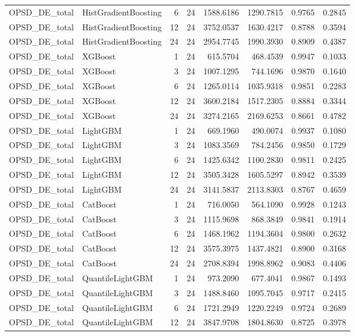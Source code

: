 \begin{tabular}{llrrrrrr}
OPSD_DE_total & HistGradientBoosting & 6 & 24 & 1588.6186 & 1290.7815 & 0.9765 & 0.2845 \\
OPSD_DE_total & HistGradientBoosting & 12 & 24 & 3752.0537 & 1630.4217 & 0.8788 & 0.3594 \\
OPSD_DE_total & HistGradientBoosting & 24 & 24 & 2954.7745 & 1990.3930 & 0.8909 & 0.4387 \\
OPSD_DE_total & XGBoost & 1 & 24 & 615.5704 & 468.4539 & 0.9947 & 0.1033 \\
OPSD_DE_total & XGBoost & 3 & 24 & 1007.1295 & 744.1696 & 0.9870 & 0.1640 \\
OPSD_DE_total & XGBoost & 6 & 24 & 1265.0114 & 1035.9318 & 0.9851 & 0.2283 \\
OPSD_DE_total & XGBoost & 12 & 24 & 3600.2184 & 1517.2305 & 0.8884 & 0.3344 \\
OPSD_DE_total & XGBoost & 24 & 24 & 3274.2165 & 2169.6253 & 0.8661 & 0.4782 \\
OPSD_DE_total & LightGBM & 1 & 24 & 669.1960 & 490.0074 & 0.9937 & 0.1080 \\
OPSD_DE_total & LightGBM & 3 & 24 & 1083.3569 & 784.2456 & 0.9850 & 0.1729 \\
OPSD_DE_total & LightGBM & 6 & 24 & 1425.6342 & 1100.2830 & 0.9811 & 0.2425 \\
OPSD_DE_total & LightGBM & 12 & 24 & 3505.3428 & 1605.5297 & 0.8942 & 0.3539 \\
OPSD_DE_total & LightGBM & 24 & 24 & 3141.5837 & 2113.8303 & 0.8767 & 0.4659 \\
OPSD_DE_total & CatBoost & 1 & 24 & 716.0050 & 564.1090 & 0.9928 & 0.1243 \\
OPSD_DE_total & CatBoost & 3 & 24 & 1115.9698 & 868.3849 & 0.9841 & 0.1914 \\
OPSD_DE_total & CatBoost & 6 & 24 & 1468.1962 & 1194.3604 & 0.9800 & 0.2632 \\
OPSD_DE_total & CatBoost & 12 & 24 & 3575.3975 & 1437.4821 & 0.8900 & 0.3168 \\
OPSD_DE_total & CatBoost & 24 & 24 & 2708.8394 & 1998.8962 & 0.9083 & 0.4406 \\
OPSD_DE_total & QuantileLightGBM & 1 & 24 & 973.2090 & 677.4041 & 0.9867 & 0.1493 \\
OPSD_DE_total & QuantileLightGBM & 3 & 24 & 1488.8460 & 1095.7045 & 0.9717 & 0.2415 \\
OPSD_DE_total & QuantileLightGBM & 6 & 24 & 1721.2949 & 1220.2249 & 0.9724 & 0.2689 \\
OPSD_DE_total & QuantileLightGBM & 12 & 24 & 3847.9708 & 1804.8630 & 0.8725 & 0.3978 \\

\end{tabular}
